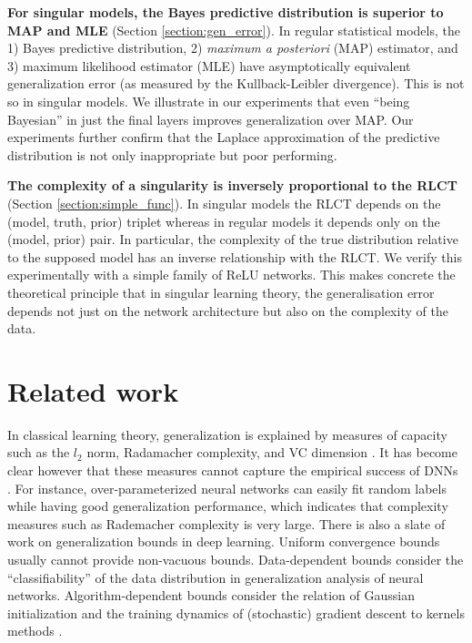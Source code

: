 \documentclass{article} %
\begin{document}
\textbf{For singular models, the Bayes predictive distribution is superior to MAP and MLE} (Section \ref{section:gen_error}). In regular statistical models,  the 1) Bayes predictive distribution, 2) \textit{maximum a posteriori} (MAP) estimator, and 3) maximum likelihood estimator (MLE) have asymptotically equivalent generalization error (as measured by the Kullback-Leibler divergence). This is not so in singular models. We illustrate in our experiments that even ``being Bayesian'' in just the final layers improves generalization over MAP. Our experiments further confirm that the Laplace approximation of the predictive distribution \citet{le_bayesian_2018,zhang_energyentropy_2018} is not only inappropriate but poor performing.

\textbf{The complexity of a singularity is inversely proportional to the RLCT} (Section \ref{section:simple_func}). In singular models the RLCT depends on the (model, truth, prior) triplet whereas in regular models it depends only on the (model, prior) pair. In particular, the complexity of the true distribution relative to the supposed model has an inverse relationship with the RLCT. We verify this experimentally with a simple family of ReLU networks. This makes concrete the theoretical principle that in singular learning theory, the generalisation error depends not just on the network architecture but also on the complexity of the data. %

\section{Related work}
In classical learning theory, generalization is explained by measures of capacity such as the $l_2$ norm, Radamacher complexity, and VC dimension \citep{bousquet2003introduction}. It has become clear however that these measures cannot capture the empirical success of DNNs \citep{zhang_understanding_2017}. 
For instance, over-parameterized neural networks can easily fit random labels \cite{zhang2016understanding,du2018gradient,allen2019convergence} while having good generalization performance, which indicates that complexity measures such as Rademacher complexity is very large.
There is also a slate of work on generalization bounds in deep learning. Uniform convergence bounds \citep{neyshabur2015norm,bartlett2017spectrally,neyshabur2018towards,neyshabur2019towards,arora2018stronger} usually cannot provide non-vacuous bounds.
Data-dependent bounds \citep{brutzkus2017sgd,li2018learning,allen2019learning} consider the ``classifiability'' of the data distribution in generalization analysis of neural networks.
Algorithm-dependent bounds \cite{daniely2017sgd,arora2019fine,yehudai2019power,cao2019generalization} consider the relation of Gaussian initialization and the training dynamics of (stochastic) gradient descent to kernels methods \citep{jacot2018neural}.
\end{document}
